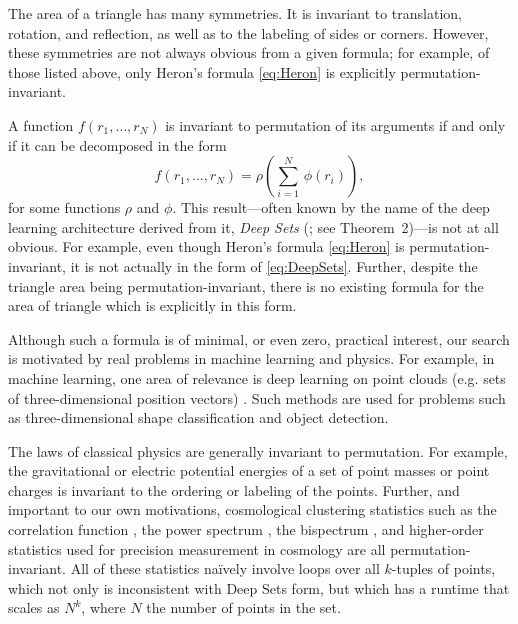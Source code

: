 \documentclass[12pt]{article}
\newcommand{\CH}[1]{{\color{blue} (CH says: #1)}}
\newcommand{\Hogg}[1]{{\color{violet} (Hogg says: #1)}}
\newcommand{\pseudosection}[1]
{}
\begin{document}
The area of a triangle has many symmetries. It is invariant to translation, rotation, and reflection, as well as to the labeling of sides or corners. However, these symmetries are not always obvious from a given formula; for example, of those listed above, only Heron's formula \eqref{eq:Heron} is explicitly permutation-invariant. 


\pseudosection{Deep Sets}

A function $f(r_1, \dots, r_N)$ is invariant to permutation of its arguments if and only if it can be decomposed in the form
\begin{equation}
    f(r_1, \dots, r_N) = \rho \left( {\textstyle \sum_{i=1}^{N}} \, \phi(r_i) \right), \label{eq:DeepSets}
\end{equation}
for some functions $\rho$ and $\phi$. This result---often known by the name of the deep learning architecture derived from it, \emph{Deep Sets} (\citealt{zaheer+17deepsets}; see Theorem~2)---is not at all obvious.
For example, even though Heron's formula \eqref{eq:Heron} is permutation-invariant, it is not actually in the form of \eqref{eq:DeepSets}. 
Further, despite the triangle area being permutation-invariant, there is no existing formula for the area of triangle which is explicitly in this form.

\pseudosection{Computational motivations}


Although such a formula is of minimal, or even zero, practical interest, our search is motivated by real problems in machine learning and physics.
For example, in machine learning, one area of relevance is deep learning on point clouds (e.g. sets of three-dimensional position vectors) \citep{guo2020pointclouds}.
Such methods are used for problems such as three-dimensional shape classification and object detection.

\pseudosection{Cosmology motivations}

The laws of classical physics are generally invariant to permutation.
For example, the gravitational or electric potential energies of a set of point masses or point charges is invariant to the ordering or labeling of the points.
Further, and important to our own motivations, cosmological clustering statistics such as 
the correlation function \citep{},
the power spectrum \citep{},
the bispectrum \citep{},
and higher-order statistics \citep{}
used for precision measurement in cosmology \citep{}
are all permutation-invariant.
All of these statistics na\"ively involve loops over all $k$-tuples of points, which not only is inconsistent with Deep Sets form, but which has a runtime that scales as $N^k$, where $N$ the number of points in the set.
\end{document}
